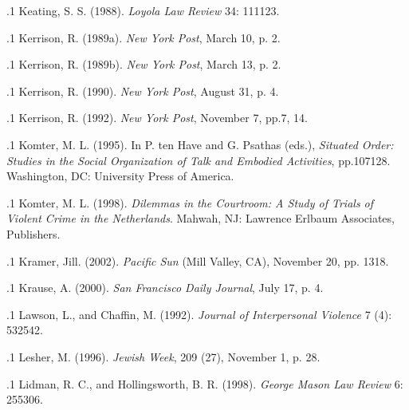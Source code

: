 \documentclass[11pt, twoside]{article}
\begin{document}
{\p.1{%
Keating, S. S. (1988). 
\textit{Loyola Law Review} 34: 111\ndash{}123.
}%

\p.1{%
Kerrison, R. (1989a).  \textit{New York Post}, March 10, p. 2.
}%

\p.1{%
Kerrison, R. (1989b).  \textit{New York Post}, March 13, p. 2.
}%

\p.1{%
Kerrison, R. (1990).  \textit{New York Post}, August 31, p. 4.
}%

\p.1{%
Kerrison, R. (1992).  \textit{New York Post},
November 7, pp.\@ 7, 14.
}%

\p.1{%
Komter, M. L. (1995).  In
P. ten Have and G. Psathas (eds.), \textit{Situated Order: Studies in the Social Organization
of Talk and Embodied Activities}, pp.\@ 107\ndash{}128. Washington, DC: University Press
of America.
}%

\p.1{%
Komter, M. L. (1998). \textit{Dilemmas in the Courtroom: A Study of Trials of Violent Crime
in the Netherlands}. Mahwah, NJ: Lawrence Erlbaum Associates, Publishers.
}%

\p.1{%
Kramer, Jill. (2002).  \textit{Pacific Sun} (Mill Valley, CA), November 20, pp.\@
13\ndash{}18.
}%

\p.1{%
Krause, A. (2000).  \textit{San Francisco Daily
Journal}, July 17, p. 4.
}%

\p.1{%
Lawson, L., and Chaffin, M. (1992).  \textit{Journal of Interpersonal Violence} 7 (4): 532\ndash{}542.
}%

\p.1{%
Lesher, M. (1996).  \textit{Jewish
Week}, 209 (27), November 1, p. 28.
}%

\p.1{%
Lidman, R. C., and Hollingsworth, B. R. (1998).  \textit{George Mason Law Review} 6: 255\ndash{}306.
}%

}
\end{document}
